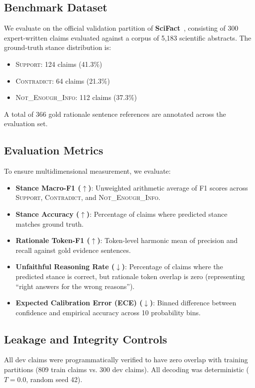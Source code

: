 \documentclass[10pt,journal,compsoc]{IEEEtran}
\begin{document}
\subsection{Benchmark Dataset}
We evaluate on the official validation partition of \textbf{SciFact}~\cite{wadden2020fact}, consisting of 300 expert-written claims evaluated against a corpus of 5,183 scientific abstracts. The ground-truth stance distribution is:
\begin{itemize}
    \item \textsc{Support}: 124 claims (41.3\%)
    \item \textsc{Contradict}: 64 claims (21.3\%)
    \item \textsc{Not\_Enough\_Info}: 112 claims (37.3\%)
\end{itemize}
A total of 366 gold rationale sentence references are annotated across the evaluation set.

\subsection{Evaluation Metrics}
To ensure multidimensional measurement, we evaluate:
\begin{itemize}
    \item \textbf{Stance Macro-F1 ($\uparrow$)}: Unweighted arithmetic average of F1 scores across \textsc{Support}, \textsc{Contradict}, and \textsc{Not\_Enough\_Info}.
    \item \textbf{Stance Accuracy ($\uparrow$)}: Percentage of claims where predicted stance matches ground truth.
    \item \textbf{Rationale Token-F1 ($\uparrow$)}: Token-level harmonic mean of precision and recall against gold evidence sentences.
    \item \textbf{Unfaithful Reasoning Rate ($\downarrow$)}: Percentage of claims where the predicted stance is correct, but rationale token overlap is zero (representing ``right answers for the wrong reasons'').
    \item \textbf{Expected Calibration Error (ECE) ($\downarrow$)}: Binned difference between confidence and empirical accuracy across 10 probability bins.
\end{itemize}

\subsection{Leakage and Integrity Controls}
All dev claims were programmatically verified to have zero overlap with training partitions (809 train claims vs. 300 dev claims). All decoding was deterministic ($T = 0.0$, random seed 42).
\end{document}
